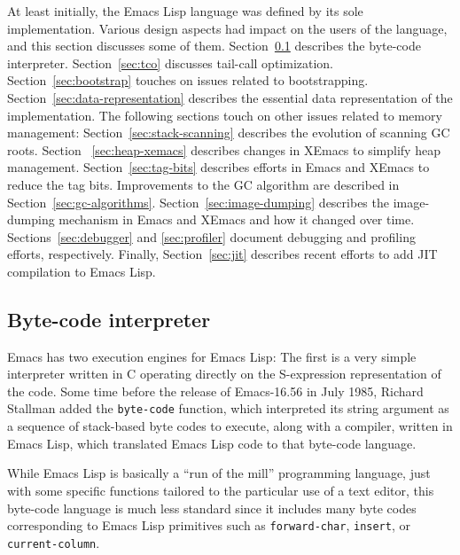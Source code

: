 \documentclass[format=acmsmall, review]{acmart}
\newcommand \Elisp {Emacs Lisp}
\begin{document}
At least initially, the \Elisp{} language was defined by its sole
implementation.  Various design aspects had impact on the users of the
language, and this section discusses some of them.
Section~\ref{sec:byte-code-interpreter} describes the byte-code
interpreter.
Section~\ref{sec:tco} discusses tail-call optimization.
Section~\ref{sec:bootstrap} touches on issues related to bootstrapping.
Section~\ref{sec:data-representation} describes the
essential data representation of the implementation.  The following
sections touch on other issues related to memory management:
Section~\ref{sec:stack-scanning} describes the evolution of scanning
GC roots. Section ~\ref{sec:heap-xemacs} describes changes in XEmacs
to simplify heap management.  Section~\ref{sec:tag-bits} describes
efforts in Emacs and XEmacs to reduce the tag bits.  Improvements to
the GC algorithm are described in Section~\ref{sec:gc-algorithms}.
Section~\ref{sec:image-dumping} describes the
image-dumping mechanism in Emacs and XEmacs and how it changed over time.
Sections~\ref{sec:debugger} and \ref{sec:profiler} document
debugging and profiling efforts, respectively.  Finally,
Section~\ref{sec:jit} describes recent efforts to add JIT compilation
to \Elisp{}.

\subsection{Byte-code interpreter}
\label{sec:byte-code-interpreter}

Emacs has two execution engines for \Elisp: The first is a very simple
interpreter written in C operating directly on the S-expression
representation of the code.
Some time before the release of Emacs-16.56 in July 1985,
Richard Stallman added the \texttt{byte-code} function, which interpreted its string
argument as a sequence of stack-based byte codes to execute, along with
a compiler, written in \Elisp{}, which translated \Elisp{} code to that
byte-code language.

While \Elisp{} is basically a ``run of the mill'' programming language, just
with some specific functions tailored to the particular use of a text
editor, this byte-code language is much less standard since it includes many
byte codes corresponding to \Elisp{} primitives such as
\texttt{forward-char}, \texttt{insert}, or \texttt{current-column}.
\end{document}
